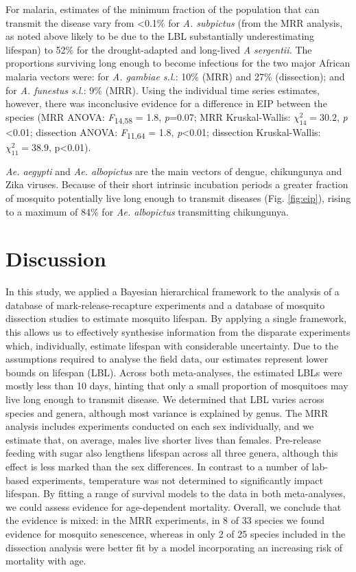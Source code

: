 \documentclass[]{article}
\begin{document}
For malaria, estimates of the minimum fraction of the population that
can transmit the disease vary from \textless{}0.1\% for \emph{A.
subpictus} (from the MRR analysis, as noted above likely to be due to
the LBL substantially underestimating lifespan) to 52\% for the
drought-adapted and long-lived \emph{A sergentii.} The proportions
surviving long enough to become infectious for the two major African
malaria vectors were: for \emph{A. gambiae s.l.}: 10\% (MRR) and 27\%
(dissection); and for \emph{A. funestus s.l.}: 9\% (MRR). Using the
individual time series estimates, however, there was inconclusive
evidence for a difference in EIP between the species (MRR ANOVA:
\emph{F}\textsubscript{14,58} = 1.8, \emph{p}=0.07; MRR Kruskal-Wallis:
\(\chi_{14}^{2} = 30.2\), \emph{p} \textless{}0.01; dissection ANOVA:
\emph{F}\textsubscript{11,64} = 1.8, \emph{p}\textless{}0.01; dissection
Kruskal-Wallis: \(\chi_{11}^{2} = 38.9\), p\textless{}0.01).

\emph{Ae. aegypti} and \emph{Ae. albopictus} are the main vectors of
dengue, chikungunya and Zika viruses. Because of their short intrinsic
incubation periods a greater fraction of mosquito potentially live long
enough to transmit diseases (Fig. \ref{fig:eip}), rising to a maximum of 84\% for
\emph{Ae. albopictus} transmitting chikungunya.

\section{Discussion}\label{discussion}

In this study, we applied a Bayesian hierarchical framework to the
analysis of a database of mark-release-recapture experiments and a
database of mosquito dissection studies to estimate mosquito lifespan.
By applying a single framework, this allows us to effectively synthesise
information from the disparate experiments which, individually, estimate
lifespan with considerable uncertainty. Due to the assumptions required
to analyse the field data, our estimates represent lower bounds on
lifespan (LBL). Across both meta-analyses, the estimated LBLs were
mostly less than 10 days, hinting that only a small proportion of
mosquitoes may live long enough to transmit disease. We determined that
LBL varies across species and genera, although most variance is
explained by genus. The MRR analysis includes experiments conducted on
each sex individually, and we estimate that, on average, males live
shorter lives than females. Pre-release feeding with sugar also
lengthens lifespan across all three genera, although this effect is less
marked than the sex differences. In contrast to a number of lab-based
experiments, temperature was not determined to significantly impact
lifespan. By fitting a range of survival models to the data in both
meta-analyses, we could assess evidence for age-dependent mortality.
Overall, we conclude that the evidence is mixed: in the MRR experiments,
in 8 of 33 species we found evidence for mosquito senescence, whereas in
only 2 of 25 species included in the dissection analysis were better fit
by a model incorporating an increasing risk of mortality with age.
\end{document}
